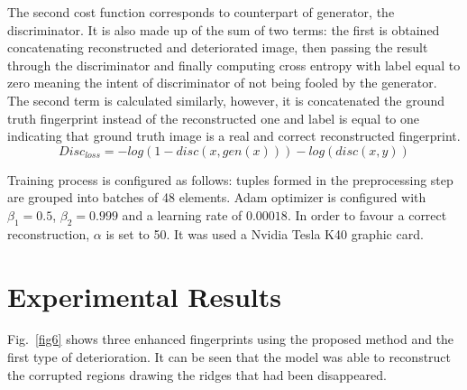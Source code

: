 \documentclass[a4paper,fleqn]{cas-dc}
\begin{document}
The second cost function corresponds to counterpart of generator, the discriminator. It is also made up of the sum of two terms: the first is obtained concatenating reconstructed and deteriorated image, then passing the result through the discriminator and finally computing cross entropy with label equal to zero meaning the intent of discriminator of not being fooled by the generator. The second term is calculated similarly, however, it is concatenated the ground truth fingerprint instead of the reconstructed one and label is equal to one indicating that ground truth image is a real and correct reconstructed fingerprint.
\begin{equation}
    Disc_{loss} = -log(1-disc(x,gen(x)))-log(disc(x,y))
\end{equation}

Training process is configured as follows: tuples formed in the preprocessing step are grouped into batches of 48 elements. Adam optimizer is configured with $\beta_{1}=0.5$, $\beta_{2}=0.999$ and a learning rate of $0.00018$. In order to favour a correct reconstruction, $\alpha$ is set to 50. It was used a Nvidia Tesla K40 graphic card.

\section{Experimental Results}
\label{sec:R}

Fig.~\ref{fig6} shows three enhanced fingerprints using the proposed method and the first type of deterioration. It can be seen that the model was able to reconstruct the corrupted regions drawing the ridges that had been disappeared.
\end{document}
